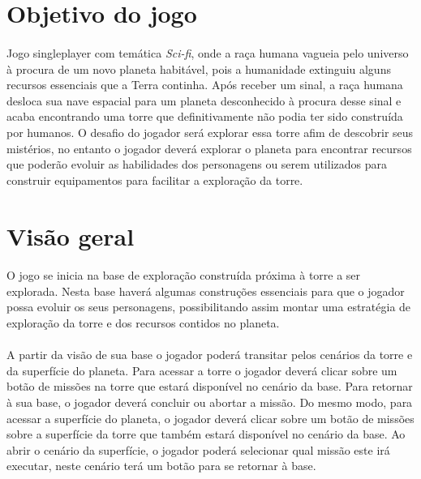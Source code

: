\documentclass[11pt]{article} %
\begin{document}
\newpage

\section{Objetivo do jogo}

\paragraph{}Jogo singleplayer com temática \textit{Sci-fi}, onde a raça humana vagueia pelo universo à procura de um novo planeta habitável, pois a humanidade extinguiu alguns recursos essenciais que a Terra continha. Após receber um sinal, a raça humana desloca sua nave espacial para um planeta desconhecido à procura desse sinal e acaba encontrando uma torre que definitivamente não podia ter sido construída por humanos. O desafio do jogador será explorar essa torre afim de descobrir seus mistérios, no entanto o jogador deverá explorar o planeta para encontrar recursos que poderão evoluir as habilidades dos personagens ou serem utilizados para construir equipamentos para facilitar a exploração da torre.


\section{Visão geral}

\paragraph{}O jogo se inicia na base de exploração construída próxima à torre a ser explorada. Nesta base haverá algumas construções essenciais para que o jogador possa evoluir os seus personagens, possibilitando assim montar uma estratégia de exploração da torre e dos recursos contidos no planeta.

\paragraph{}A partir da visão de sua base o jogador poderá transitar pelos cenários da torre e da superfície do planeta. Para acessar a torre o jogador deverá clicar sobre um botão de missões na torre que estará disponível no cenário da base. Para retornar à sua base, o jogador deverá concluir ou abortar a missão. Do mesmo modo, para acessar a superfície do planeta, o jogador deverá clicar sobre um botão de missões sobre a superfície da torre que também estará disponível no cenário da base. Ao abrir o cenário da superfície, o jogador poderá selecionar qual missão este irá executar, neste cenário terá um botão para se retornar à base.
\end{document}
